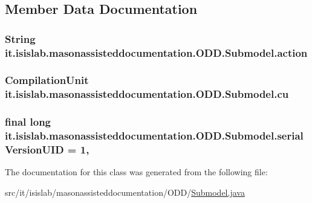 \subsection{Member Data Documentation}
\hypertarget{classit_1_1isislab_1_1masonassisteddocumentation_1_1_o_d_d_1_1_submodel_af81356d376de8ea0609a727812d8af16}{
\subsubsection[{action}]{\setlength{\rightskip}{0pt plus 5cm}String it.\-isislab.\-masonassisteddocumentation.\-O\-D\-D.\-Submodel.\-action\hspace{0.3cm}{\ttfamily [private]}}}\label{classit_1_1isislab_1_1masonassisteddocumentation_1_1_o_d_d_1_1_submodel_af81356d376de8ea0609a727812d8af16}
\hypertarget{classit_1_1isislab_1_1masonassisteddocumentation_1_1_o_d_d_1_1_submodel_add685fad5849351f5a5bbdec1ebc49a5}{
\subsubsection[{cu}]{\setlength{\rightskip}{0pt plus 5cm}Compilation\-Unit it.\-isislab.\-masonassisteddocumentation.\-O\-D\-D.\-Submodel.\-cu\hspace{0.3cm}{\ttfamily [private]}}}\label{classit_1_1isislab_1_1masonassisteddocumentation_1_1_o_d_d_1_1_submodel_add685fad5849351f5a5bbdec1ebc49a5}
\hypertarget{classit_1_1isislab_1_1masonassisteddocumentation_1_1_o_d_d_1_1_submodel_a3a803e7616f2ac4e588f6b8ba0e7b6d0}{
\subsubsection[{serial\-Version\-U\-I\-D}]{\setlength{\rightskip}{0pt plus 5cm}final long it.\-isislab.\-masonassisteddocumentation.\-O\-D\-D.\-Submodel.\-serial\-Version\-U\-I\-D = 1\hspace{0.3cm}{\ttfamily [static]}, {\ttfamily [private]}}}\label{classit_1_1isislab_1_1masonassisteddocumentation_1_1_o_d_d_1_1_submodel_a3a803e7616f2ac4e588f6b8ba0e7b6d0}


The documentation for this class was generated from the following file\-:\begin{DoxyCompactItemize}
\item 
src/it/isislab/masonassisteddocumentation/\-O\-D\-D/\hyperlink{_submodel_8java}{Submodel.\-java}\end{DoxyCompactItemize}
